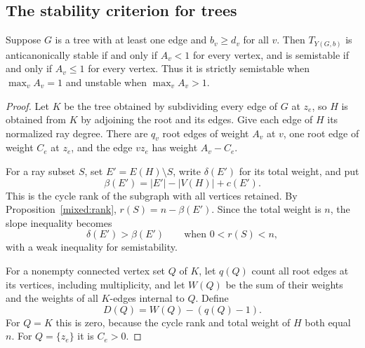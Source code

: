 \subsection{The stability criterion for trees}

\begin{theorem}\label{mixed:tree}
Suppose $G$ is a tree with at least one edge and $b_v\ge d_v$ for all
$v$. Then $T_{Y(G,b)}$ is anticanonically stable if and only if
$A_v<1$ for every vertex, and is semistable if and only if $A_v\le1$
for every vertex. Thus it is strictly semistable when $\max_v A_v=1$
and unstable when $\max_v A_v>1$.
\end{theorem}

\begin{proof}
Let $K$ be the tree obtained by subdividing every edge of $G$ at $z_e$,
so $H$ is obtained from $K$ by adjoining the root and its edges. Give
each edge of $H$ its normalized ray degree. There are $q_v$ root edges
of weight $A_v$ at $v$, one root edge of weight $C_e$ at $z_e$, and
the edge $v z_e$ has weight $A_v-C_e$.

For a ray subset $S$, set $E'=E(H)\setminus S$, write $\delta(E')$
for its total weight, and put
\[
 \beta(E')=|E'|-|V(H)|+c(E').
\]
This is the cycle rank of the subgraph with all vertices retained. By
Proposition~\ref{mixed:rank}, $r(S)=n-\beta(E')$. Since the total
weight is $n$, the slope inequality becomes
\begin{equation}\label{mixed:complement-test}
 \delta(E')>\beta(E')\qquad\text{when }0<r(S)<n,
\end{equation}
with a weak inequality for semistability.

For a nonempty connected vertex set $Q$ of $K$, let $q(Q)$ count all
root edges at its vertices, including multiplicity, and let $W(Q)$ be
the sum of their weights and the weights of all $K$-edges internal to
$Q$. Define
\[
 D(Q)=W(Q)-(q(Q)-1).
\]
For $Q=K$ this is zero, because the cycle rank and total weight of $H$
both equal $n$. For $Q=\{z_e\}$ it is $C_e>0$.


\end{proof}
